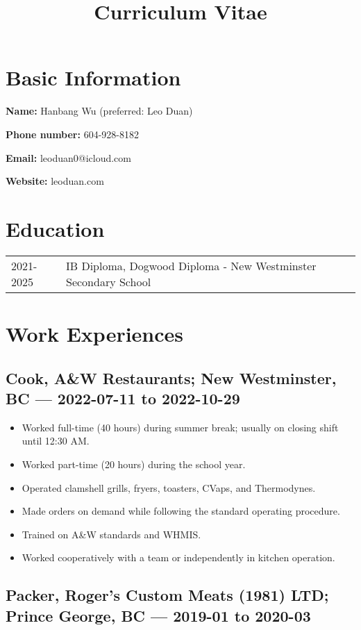 \documentclass{article}
\title{\textbf{Curriculum Vitae}}
\author{}
\date{}
\begin{document}
\maketitle

\section*{Basic Information}

\textbf{Name:} Hanbang Wu (preferred: Leo Duan)

\textbf{Phone number:} 604-928-8182

\textbf{Email:} leoduan0@icloud.com

\textbf{Website:} leoduan.com

\section*{Education}

\begin{tabular}{@{}ll}
	2021-2025 & IB Diploma, Dogwood Diploma - New Westminster Secondary School \\
\end{tabular}

\section*{Work Experiences}

\subsection*{Cook, A\&W Restaurants; New Westminster, BC — 2022-07-11 to 2022-10-29}

\begin{itemize}
	\item Worked full-time (40 hours) during summer break; usually on closing shift until 12:30 AM.
	\item Worked part-time (20 hours) during the school year.
	\item Operated clamshell grills, fryers, toasters, CVaps, and Thermodynes.
	\item Made orders on demand while following the standard operating procedure.
	\item Trained on A\&W standards and WHMIS.
	\item Worked cooperatively with a team or independently in kitchen operation.
\end{itemize}

\subsection*{Packer, Roger's Custom Meats (1981) LTD; Prince George, BC — 2019-01 to 2020-03}
\end{document}
